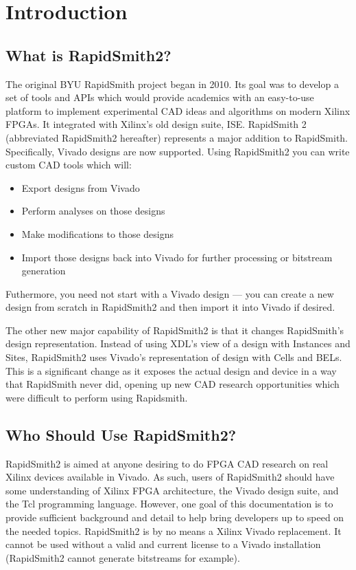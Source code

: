 \newpage
\section{Introduction}
\subsection{What is RapidSmith2?}
The original BYU RapidSmith project began in 2010. Its goal was to develop
a set of tools and APIs which would provide academics with an
easy-to-use platform to implement experimental CAD ideas and algorithms on
modern Xilinx FPGAs. It integrated with Xilinx's old design suite, ISE.
RapidSmith 2 (abbreviated RapidSmith2 hereafter) represents a major addition to
RapidSmith. Specifically, Vivado designs are now supported. Using RapidSmith2 you can
write custom CAD tools which will: 
\begin{itemize}
  \item Export designs from Vivado
  \item Perform analyses on those designs
  \item Make modifications to those designs
  \item Import those designs back into Vivado for further processing or
  bitstream generation
\end{itemize}
Futhermore, you need not start with a Vivado design --- 
you can create a new design from scratch in RapidSmith2 and then import it into Vivado
if desired.

The other new major capability of RapidSmith2 is that it changes RapidSmith's design
representation. Instead of using XDL's view of a design with Instances and
Sites, RapidSmith2 uses Vivado's representation of design with Cells and BELs. This
is a significant change as it exposes the actual design and device in a way
that RapidSmith never did, opening up new CAD research opportunities which were
difficult to perform using Rapidsmith.
       
\subsection{Who Should Use RapidSmith2?}
RapidSmith2 is aimed at anyone desiring to do FPGA CAD research on real Xilinx devices
available in Vivado. As such, users of RapidSmith2 should have some understanding of
Xilinx FPGA architecture, the Vivado design suite, and the Tcl programming
language. However, one goal of this documentation is to provide sufficient
background and detail to help bring developers up to speed on the needed
topics. RapidSmith2 is by no means a Xilinx Vivado replacement. It cannot be used
without a valid and current license to a Vivado installation (RapidSmith2
cannot generate bitstreams for example).

